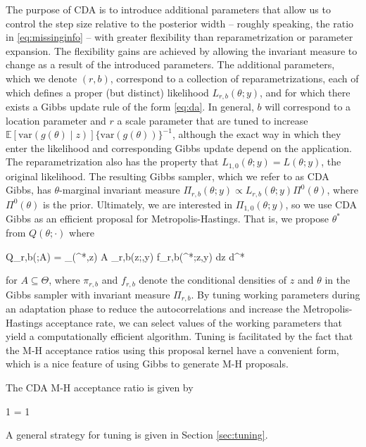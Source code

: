 \documentclass[11pt]{article}
\newcommand{\be}{\begin{equs}}
\newcommand{\ee}{\end{equs}}
\newcommand{\bb}[1]{\mathbb{#1}}
\newcommand{\mc}[1]{\mathcal{#1}}
\newcommand{\var}{\text{var}}
\begin{document}
The purpose of CDA is to introduce additional parameters that allow us to control the step size relative to the posterior width -- roughly speaking, the ratio in \eqref{eq:missinginfo} -- with greater flexibility than reparametrization or parameter expansion. The flexibility gains are achieved by allowing the invariant measure to change as a result of the introduced parameters. The additional parameters, which we denote $(r,b)$, correspond to a collection of reparametrizations, each of which defines a proper (but distinct) likelihood $L_{r,b}(\theta;y)$, and for which there exists a Gibbs update rule of the form \eqref{eq:da}. In general, $b$ will correspond to a location parameter and $r$ a scale parameter that are tuned to increase $\bb E[\var(g(\theta) \mid z)]\{\var(g(\theta))\}^{-1}$, although the exact way in which they enter the likelihood and corresponding Gibbs update depend on the application. The reparametrization also has the property that $L_{1,0}(\theta;y) = L(\theta;y)$, the original likelihood. The resulting Gibbs sampler, which we refer to as CDA Gibbs, has $\theta$-marginal invariant measure $\Pi_{r,b}(\theta;y) \propto L_{r,b}(\theta;y) \Pi^0(\theta)$, where $\Pi^0(\theta)$ is the prior. Ultimately, we are interested in $\Pi_{1,0}(\theta;y)$, so we use CDA Gibbs as an efficient proposal for Metropolis-Hastings. That is, we propose $\theta^*$ from $Q(\theta;\cdot)$ where
\be \label{eq:Q}
Q_{r,b}(\theta;A) = \int_{(\theta^*,z) \in A \times \mc Z} \pi_{r,b}(z;\theta,y) f_{r,b}(\theta^*;z,y) dz d\theta^*
\ee
for $A \subseteq \Theta$, where $\pi_{r,b}$ and $f_{r,b}$ denote the conditional densities of $z$ and $\theta$ in the Gibbs sampler with invariant measure $\Pi_{r,b}$. By tuning working parameters during an adaptation phase to reduce the autocorrelations and increase the Metropolis-Hastings acceptance rate, we can select values of the working parameters that yield a computationally efficient algorithm. Tuning is facilitated by the fact that the M-H acceptance ratios using this proposal kernel have a convenient form, which is a nice feature of using Gibbs to generate M-H proposals.
\begin{remark} \label{rem:accrat}
The CDA M-H acceptance ratio is given by
\be
1 \wedge {} = 1 \wedge {} \label{eq:mh-accrat}
\ee
\end{remark}
A general strategy for tuning is given in Section \ref{sec:tuning}. 
\end{document}
